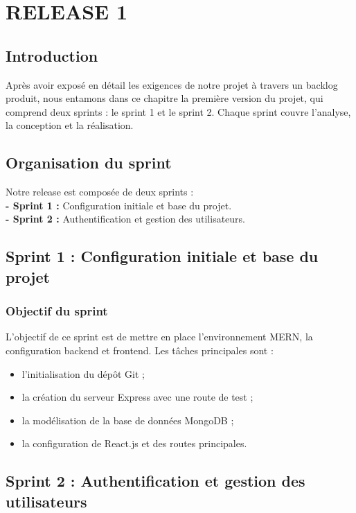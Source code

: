 \chapter{RELEASE 1}

\section*{Introduction}
Après avoir exposé en détail les exigences de notre projet à travers un backlog produit, nous entamons dans ce chapitre la première version du projet, qui comprend deux sprints : le sprint 1 et le sprint 2. Chaque sprint couvre l'analyse, la conception et la réalisation.

\section{Organisation du sprint}
Notre release est composée de deux sprints :\\
\textbf{- Sprint 1 :} Configuration initiale et base du projet.\\
\textbf{- Sprint 2 :} Authentification et gestion des utilisateurs.

\section{Sprint 1 : Configuration initiale et base du projet}
\subsection{Objectif du sprint}
L'objectif de ce sprint est de mettre en place l'environnement MERN, la configuration backend et frontend. Les tâches principales sont :
\begin{itemize}
    \item l'initialisation du dépôt Git ;
    \item la création du serveur Express avec une route de test ;
    \item la modélisation de la base de données MongoDB ;
    \item la configuration de React.js et des routes principales.
\end{itemize}

\section{Sprint 2 : Authentification et gestion des utilisateurs}

